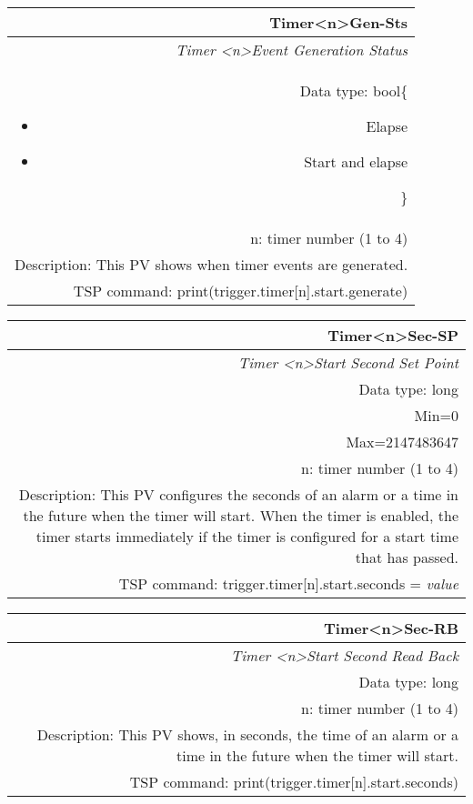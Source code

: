\documentclass[openany]{article}
\begin{document}
		\begin{tabular}{N}
			\hline
			\bfseries Timer{\textless n\textgreater}Gen-Sts\label{pv:timergen-sts} \\ \hline
			\emph{Timer \textless n\textgreater Event Generation Status} \\
			Data type: bool\{\begin{itemize}[noitemsep]
				\small
				\item[] Elapse
				\item[] Start and elapse
			\end{itemize}\} \\
			n: timer number (1 to 4) \\
			Description: This PV shows when timer events are generated. \\
			TSP command: print(trigger.timer[n].start.generate)
		\end{tabular}

		\begin{tabular}{N}
			\hline
			\bfseries Timer{\textless n\textgreater}Sec-SP\label{pv:timersec-sp} \\ \hline
			\emph{Timer \textless n\textgreater Start Second Set Point} \\
			Data type: long \\
			Min=0 \\ 
			Max=2147483647 \\
			n: timer number (1 to 4) \\
			Description: This PV configures the seconds of an alarm or a time in the future when the timer will start. When the timer is enabled, the timer starts immediately if the timer is configured for a start time that has passed. \\
			TSP command: trigger.timer[n].start.seconds = \emph{value}
		\end{tabular}

		\begin{tabular}{N}
			\hline
			\bfseries Timer{\textless n\textgreater}Sec-RB\label{pv:timersec-rb} \\ \hline
			\emph{Timer \textless n\textgreater Start Second Read Back} \\
			Data type: long \\
			n: timer number (1 to 4) \\
			Description: This PV shows, in seconds, the time of an alarm or a time in the future when the timer will start. \\
			TSP command: print(trigger.timer[n].start.seconds)
		\end{tabular}
\end{document}
